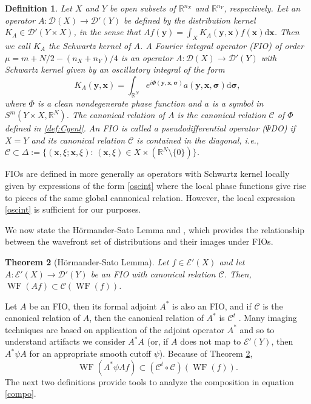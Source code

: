 \documentclass[11pt]{article}
\newcommand{\wf}{\operatorname{WF}}
\newcommand{\be}{\begin{equation}}
\newcommand{\ee}{\end{equation}}
\newcommand{\br}{\mathbb{R}}
\numberwithin{equation}{section}
\newcommand{\vy}{\mathbf{y}}
\newcommand{\vx}{\mathbf{x}}
\newcommand{\Cc}{\mathcal{C}}
\newcommand{\Dc}{\mathcal{D}}
\newcommand{\Ec}{\mathcal{E}}
\newcommand{\vsig}{{\boldsymbol{\sigma}}}
\newtheorem{theorem}{Theorem}[section]
\newtheorem{definition}[theorem]{Definition}
\theoremstyle{definition}
\begin{document}
\begin{definition}\label{FIOdef}
Let $X$ and $Y$ be open subsets of $\br^{n_X}$ and $\br^{n_Y}$, respectively. Let an operator $A :
\Dc(X)\to \mathcal{D}'(Y)$ be defined by the distribution kernel $K_A\in \mathcal{D}'(Y\times X)$, in the sense that $Af(\vy)=\int_{X}K_A(\vy,\vx)f(\vx)\mathrm{d}\vx$. Then we call $K_A$ the \emph{Schwartz kernel} of $A$. A Fourier integral operator (FIO) of order $\mu = m + N/2 - (n_X+n_Y)/4$ is an operator $A:\Dc(X)\to \mathcal{D}'(Y)$ with Schwartz kernel given by an
oscillatory integral of the form
\be \label{oscint}
K_A(\vy,\vx)=\int_{\br^N}
e^{i\Phi(\vy,\vx,\vsig)}a(\vy,\vx,\vsig) \mathrm{d}\vsig,
\ee
where $\Phi$ is a clean nondegenerate phase function and $a$ is a symbol in $S^m(Y \times X , \br^N)$. The canonical relation of $A$ is the canonical relation $\mathcal{C}$ of $\Phi$ defined in
\eqref{def:Cgenl}. An FIO is called a pseudodifferential operator ($\Psi$DO) if $X = Y$ and its canonical relation $\Cc$ is contained in the diagonal, i.e.,
$\Cc \subset \Delta := \{ (\vx,\xi;\vx,\xi):\,(\vx,\xi)\in X\times(\br^N\setminus\{0\})\}$.
\end{definition}


FIOs are defined in \cite{hor4} more generally as operators with Schwartz kernel locally given by expressions of the form \eqref{oscint} where the local phase functions give rise to pieces of the same global cannonical relation. However, the local expression \eqref{oscint} is sufficient for our purposes.

We now state the H\"ormander-Sato Lemma \cite[Theorem 8.2.13]{hor} and \cite[Lemma 25.1.2]{hor4}, which provides  the relationship between the wavefront set of distributions and their images under FIO{s}.

\begin{theorem}[H\"ormander-Sato Lemma]\label{thm:HS} Let $f\in \Ec'(X)$ and
let ${A}:\Ec'(X)\to \Dc'(Y)$ be an FIO with canonical relation $\Cc$.
Then, $\wf({A}f)\subset \Cc(\wf(f))$.
\end{theorem}

Let $A$ be an FIO, then its formal adjoint $A^*$ is also an FIO, and if $\Cc$ is the canonical relation of $A$, then the canonical relation of $A^*$ is $\Cc^t$ \cite[Theorem 25.2.2]{hor4}. Many imaging techniques are based
on application of the adjoint operator $A^*$ and so to understand artifacts we consider $A^* A$ (or, if $A$ does not map to $\Ec'(Y)$, then $A^* \psi A$ for an appropriate smooth cutoff $\psi$). Because of Theorem \ref{thm:HS},
\begin{equation}
\label{compo}
\wf(A^* \psi A f) \subset (\Cc^t \circ \Cc)(\wf(f)).
\end{equation}
The next two definitions provide tools to analyze the composition in equation \eqref{compo}.
\end{document}
